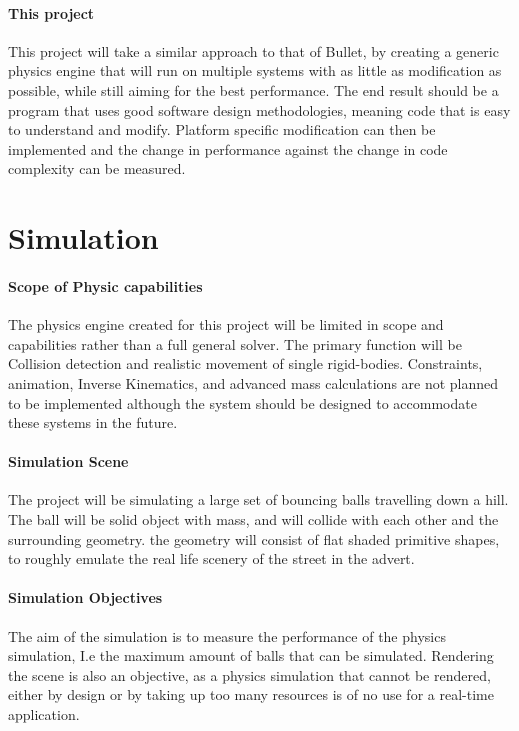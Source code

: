 \documentclass[conference]{acmsiggraph}
\begin{document}
\paragraph{This project}
This project will take a similar approach to that of Bullet, by creating a generic physics engine that will run on multiple systems with as little as modification as possible, while still aiming for the best performance. The end result should be a program that uses good software design methodologies, meaning code that is easy to understand and modify. Platform specific modification can then be implemented and the change in performance against the change in code complexity can be measured.

\section{Simulation}

\paragraph{Scope of Physic capabilities}
The physics engine created for this project will be limited in scope and capabilities rather than a full general solver. The primary function will be Collision detection and realistic movement of single rigid-bodies. Constraints, animation, Inverse Kinematics, and advanced mass calculations are not planned to be implemented although the system should be designed to accommodate these systems in the future.

\paragraph{Simulation Scene}
The project will be simulating a large set of bouncing balls travelling down a hill. The ball will be solid object with mass, and will collide with each other and the surrounding geometry. the geometry will consist of flat shaded primitive shapes, to roughly emulate the real life scenery of the street in the advert.

\paragraph{Simulation Objectives}
The aim of the simulation is to measure the performance of the physics simulation, I.e the maximum amount of balls that can be simulated. Rendering the scene is also an objective, as a physics simulation that cannot be rendered, either by design or by taking up too many resources is of no use for a real-time application.
\end{document}

